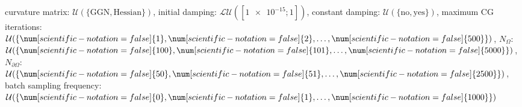 curvature matrix: $\mathcal{U}(\{\text{GGN},\text{Hessian}\})$, initial damping: $\mathcal{LU}([\num[scientific-notation=true]{1e-15}; \num[scientific-notation=false]{1}])$, constant damping: $\mathcal{U}(\{\text{no},\text{yes}\})$, maximum CG iterations: $\mathcal{U}(\{\num[scientific-notation=false]{1},\num[scientific-notation=false]{2},\text{\dots},\num[scientific-notation=false]{500}\})$, $N_{\Omega}$: $\mathcal{U}(\{\num[scientific-notation=false]{100},\num[scientific-notation=false]{101},\text{\dots},\num[scientific-notation=false]{5000}\})$, $N_{\partial\Omega}$: $\mathcal{U}(\{\num[scientific-notation=false]{50},\num[scientific-notation=false]{51},\text{\dots},\num[scientific-notation=false]{2500}\})$, batch sampling frequency: $\mathcal{U}(\{\num[scientific-notation=false]{0},\num[scientific-notation=false]{1},\text{\dots},\num[scientific-notation=false]{1000}\})$
